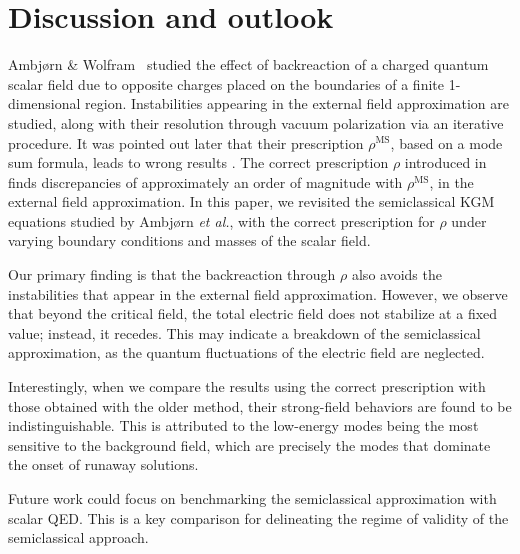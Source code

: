 \section{Discussion and outlook}
\label{sec:discussion}
Ambjørn \& Wolfram~\cite{ambjorn_properties_1983} studied the effect of backreaction of a charged quantum scalar field due to  opposite charges placed on the boundaries of a finite 1-dimensional region. 
Instabilities appearing in the external field approximation are studied, along with their resolution through vacuum polarization via an     iterative procedure.
It was pointed out later that their prescription $\rho ^\text{MS}$, based on a mode sum formula, leads to wrong results \cite{schlemmer_current_2015}.
The correct prescription $\rho$ introduced in
\cite{wernersson_vacuum_2021} finds discrepancies of approximately an order of magnitude with $\rho^\text{MS}$, in the external field approximation. 
In this paper, we  revisited the semiclassical KGM equations studied by Ambjørn \textit{et al.}, with the correct prescription for $\rho$ under  varying boundary conditions and masses of the scalar field. 


Our primary finding is that the backreaction through $\rho$ also avoids the instabilities that appear in the external field approximation. However, we observe that beyond the critical field, the total electric field does not stabilize at a fixed value; instead, it recedes. This may indicate a breakdown of the semiclassical approximation, as the quantum fluctuations of the electric field are neglected.

Interestingly, when we compare the results using the correct prescription with those obtained with the older method, their strong-field behaviors are found to be indistinguishable. This is attributed to the low-energy modes being the most sensitive to the background field, which are precisely the modes that dominate the onset of runaway solutions. 
  
Future work could focus on benchmarking the semiclassical approximation with scalar QED. This  is a key comparison for delineating the regime of validity of the semiclassical approach.